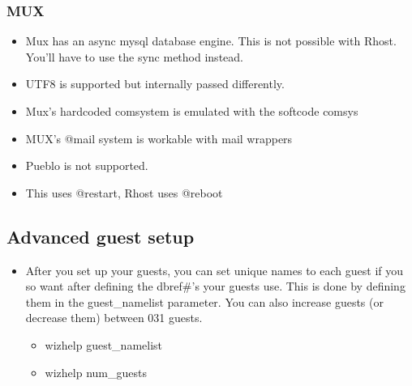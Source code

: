 \documentclass[letterpaper,10pt,english]{sphinxmanual}
\begin{document}
\subsubsection{MUX}
\label{\detokenize{features:mux}}\begin{itemize}
\item {} 
\sphinxAtStartPar
Mux has an async mysql database engine.  This is not possible with Rhost.  You’ll have to use the sync method instead.

\item {} 
\sphinxAtStartPar
UTF8 is supported but internally passed differently.

\item {} 
\sphinxAtStartPar
Mux’s hardcoded comsystem is emulated with the softcode comsys

\item {} 
\sphinxAtStartPar
MUX’s @mail system is workable with mail wrappers

\item {} 
\sphinxAtStartPar
Pueblo is not supported.

\item {} 
\sphinxAtStartPar
This uses @restart, Rhost uses @reboot

\end{itemize}


\subsection{Advanced guest setup}
\label{\detokenize{features:advanced-guest-setup}}\begin{itemize}
\item {} 
\sphinxAtStartPar
After you set up your guests, you can set unique names to each guest
if you so want after defining the dbref\#’s your guests use.  This is
done by defining them in the guest\_namelist parameter.  You can also
increase guests (or decrease them) between 0\sphinxhyphen{}31 guests.
\begin{itemize}
\item {} 
\sphinxAtStartPar
wizhelp guest\_namelist

\item {} 
\sphinxAtStartPar
wizhelp num\_guests

\end{itemize}

\end{itemize}
\end{document}
